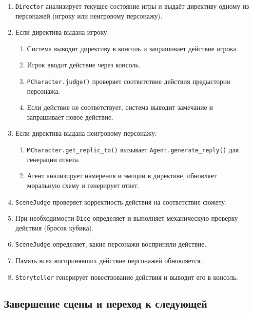 \begin{enumerate}
	\item \texttt{Director} анализирует текущее состояние игры и выдаёт директиву одному из персонажей (игроку или неигровому персонажу).
	
	\item Если директива выдана игроку:
	\begin{enumerate}
		\item Система выводит директиву в консоль и запрашивает действие игрока.
		\item Игрок вводит действие через консоль.
		\item \texttt{PCharacter.judge()} проверяет соответствие действия предыстории персонажа.
		\item Если действие не соответствует, система выводит замечание и запрашивает новое действие.
	\end{enumerate}
	
	\item Если директива выдана неигровому персонажу:
	\begin{enumerate}
		\item \texttt{MCharacter.get\_replic\_to()} вызывает \texttt{Agent.generate\_reply()} для генерации ответа.
		\item Агент анализирует намерения и эмоции в директиве, обновляет моральную схему и генерирует ответ.
	\end{enumerate}
	
	\item \texttt{SceneJudge} проверяет корректность действия на соответствие сюжету.
	
	\item При необходимости \texttt{Dice} определяет и выполняет механическую проверку действия (бросок кубика).
	
	\item \texttt{SceneJudge} определяет, какие персонажи восприняли действие.
	
	\item Память всех воспринявших действие персонажей обновляется.
	
	\item \texttt{Storyteller} генерирует повествование действия и выводит его в консоль.
\end{enumerate}

\subsection*{Завершение сцены и переход к следующей}

